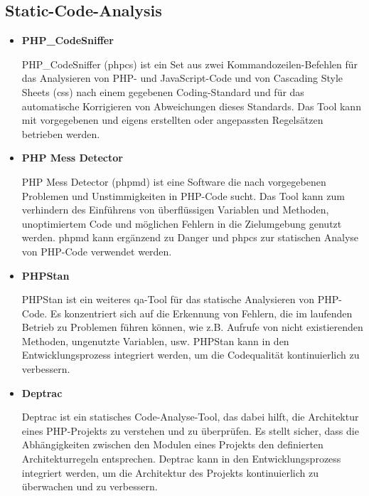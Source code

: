 \subsection*{Static-Code-Analysis}

\begin{itemize}
    \item {
        \textbf{PHP\_CodeSniffer}\par
        PHP\_CodeSniffer (\acrshort{phpcs}) ist ein Set aus zwei Kommandozeilen-Befehlen für das Analysieren von PHP-
        und JavaScript-Code und von Cascading Style Sheets (\acrshort{css}) nach einem gegebenen Coding-Standard und für
        das automatische Korrigieren von Abweichungen dieses Standards.
        Das Tool kann mit vorgegebenen und eigens erstellten oder angepassten Regelsätzen betrieben werden.
    }

    \item {
        \textbf{PHP Mess Detector}\par
        PHP Mess Detector (\acrshort{phpmd}) ist eine Software die nach vorgegebenen Problemen und Unstimmigkeiten in
        PHP-Code sucht.
        Das Tool kann zum verhindern des Einführens von überflüssigen Variablen und Methoden, unoptimiertem Code und
        möglichen Fehlern in die Zielumgebung genutzt werden.
        \acrshort{phpmd} kann ergänzend zu Danger und \acrshort{phpcs} zur statischen Analyse von PHP-Code verwendet
        werden.
    }

    \item {
        \textbf{PHPStan}\par
        PHPStan ist ein weiteres \acrshort{qa}-Tool für das statische Analysieren von PHP-Code.
        Es konzentriert sich auf die Erkennung von Fehlern, die im laufenden Betrieb zu Problemen führen können, wie
        z.B. Aufrufe von nicht existierenden Methoden, ungenutzte Variablen, usw.
        PHPStan kann in den Entwicklungsprozess integriert werden, um die Codequalität kontinuierlich zu verbessern.
    }

    \item {
        \textbf{Deptrac}\par
        Deptrac ist ein statisches Code-Analyse-Tool, das dabei hilft, die Architektur eines PHP-Projekts zu verstehen
        und zu überprüfen.
        Es stellt sicher, dass die Abhängigkeiten zwischen den Modulen eines Projekts den definierten Architekturregeln
        entsprechen.
        Deptrac kann in den Entwicklungsprozess integriert werden, um die Architektur des Projekts kontinuierlich zu
        überwachen und zu verbessern.
    }


\end{itemize}
